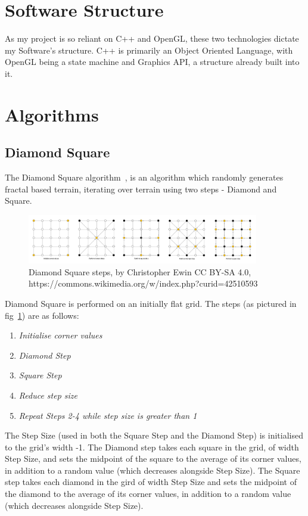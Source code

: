 \documentclass[a4paper,10pt]{report}
\begin{document}
\section{Software Structure}
As my project is so reliant on C++ and OpenGL, these two technologies dictate my Software's structure. C++ is primarily an Object Oriented Language, with OpenGL being a state machine and Graphics API, a structure already built into it. 
\section{Algorithms}
\subsection{Diamond Square}
The Diamond Square algorithm~\cite{miller1986definition}, is an algorithm which randomly generates fractal based terrain, iterating over terrain using two steps - Diamond and Square. \\ 

\begin{figure}[h!]
    \centering
  \includegraphics[width=0.9\textwidth]{Diamond_Square}
 \caption{Diamond Square steps, by Christopher Ewin CC BY-SA 4.0, https://commons.wikimedia.org/w/index.php?curid=42510593}
 \label{fig:diamond_square_steps}
\end{figure} 

Diamond Square is performed on an initially flat grid. The steps (as pictured in fig~\ref{fig:diamond_square_steps}) are as follows:

\begin{enumerate}
\item \textit{Initialise corner values}
\item \textit{Diamond Step}
\item \textit{Square Step}
\item \textit{Reduce step size} 
\item \textit{Repeat Steps 2-4 while step size is greater than 1}
\end{enumerate} 

The Step Size (used in both the Square Step and the Diamond Step) is initialised to the grid's width -1. The Diamond step takes each square in the grid, of width Step Size, and sets the midpoint of the square to the average of its corner values, in addition to a random value (which decreases alongside Step Size). The Square step takes each diamond in the gird of width Step Size and sets the midpoint of the diamond to the average of its corner values, in addition to a random value (which decreases alongside Step Size). \\
\end{document}
